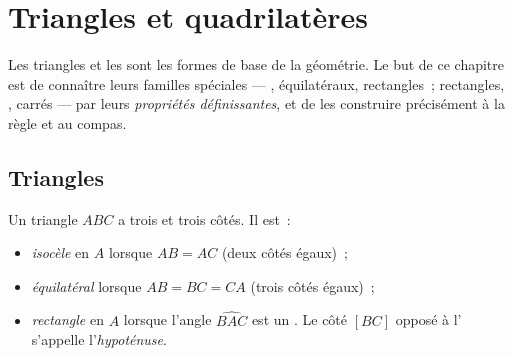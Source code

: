 \chapter{Triangles et quadrilatères}\label{ch:g6:shapes}

Les triangles et les  sont les formes de base de la
géométrie. Le but de ce chapitre est de connaître leurs familles
spéciales --- , équilatéraux, rectangles~; rectangles,
, carrés --- par leurs \emph{propriétés définissantes}, et de
les construire précisément à la règle et au compas.

\section{Triangles}

\begin{definition}\label{def:g6:shapes:triangles}
Un triangle $ABC$ a trois  et trois côtés. Il est~:
\begin{itemize}
  \item \emph{isocèle} en $A$ lorsque
        $AB = AC$ (deux côtés égaux)~;
  \item \emph{équilatéral} lorsque
        $AB = BC = CA$ (trois côtés égaux)~;
  \item \emph{rectangle} en $A$ lorsque
        l'angle $\widehat{BAC}$ est un . Le côté $[BC]$
        opposé à l' s'appelle l'\emph{hypoténuse}.
\end{itemize}
\end{definition}


